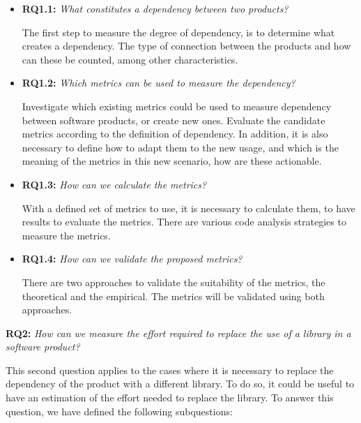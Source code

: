 \begin{itemize}
  \item \textbf{RQ1.1:} \textit{What constitutes a dependency between two products?}

  The first step to measure the degree of dependency, is to determine what creates a dependency. The type of connection between the products and how can these be counted, among other characteristics.

  \item \textbf{RQ1.2:} \textit{Which metrics can be used to measure the dependency?}

  Investigate which existing metrics could be used to measure dependency between software products, or create new ones. Evaluate the candidate metrics according to the definition of dependency. In addition, it is also necessary to define how to adapt them to the new usage, and which is the meaning of the metrics in this new scenario, how are these actionable.

  \item \textbf{RQ1.3:} \textit{How can we calculate the metrics?}

  With a defined set of metrics to use, it is necessary to calculate them, to have results to evaluate the metrics. There are various code analysis strategies to measure the metrics.

  \item \textbf{RQ1.4:} \textit{How can we validate the proposed metrics?}

  There are two approaches to validate the suitability of the metrics, the theoretical and the empirical. The metrics will be validated using both approaches.
\end{itemize}

\blankl
\textbf{RQ2:} \textit{How can we measure the effort required to replace the use of a library in a software product?}

This second question applies to the cases where it is necessary to replace the dependency of the product with a different library. To do so, it could be useful to have an estimation of the effort needed to replace the library. To answer this question, we have defined the following subquestions:

